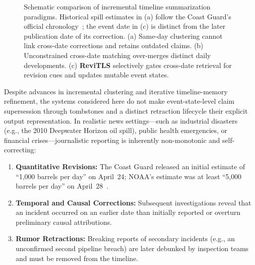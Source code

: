 \documentclass[journal]{IEEEtran}
\begin{document}
\begin{figure}[t]
{%
}
\caption{Schematic comparison of incremental timeline summarization paradigms. Historical spill estimates in (a) follow the Coast Guard's official chronology~\cite{uscg2011onscene}; the event date in (c) is distinct from the later publication date of its correction. (a) Same-day clustering cannot link cross-date corrections and retains outdated claims. (b) Unconstrained cross-date matching over-merges distinct daily developments. (c) \textbf{ReviTLS} selectively gates cross-date retrieval for revision cues and updates mutable event states.}
\label{fig:paradigm}
\end{figure}

Despite advances in incremental clustering and iterative timeline-memory refinement, the systems considered here do not make event-state-level claim supersession through tombstones and a distinct retraction lifecycle their explicit output representation. In realistic news settings---such as industrial disasters (e.g., the 2010 Deepwater Horizon oil spill), public health emergencies, or financial crises---journalistic reporting is inherently non-monotonic and self-correcting:
\begin{enumerate}
    \item \textbf{Quantitative Revisions:} The Coast Guard released an initial estimate of ``1,000 barrels per day'' on April~24; NOAA's estimate was at least ``5,000 barrels per day'' on April~28~\cite{uscg2011onscene}.
    \item \textbf{Temporal and Causal Corrections:} Subsequent investigations reveal that an incident occurred on an earlier date than initially reported or overturn preliminary causal attributions.
    \item \textbf{Rumor Retractions:} Breaking reports of secondary incidents (e.g., an unconfirmed second pipeline breach) are later debunked by inspection teams and must be removed from the timeline.
\end{enumerate}
\end{document}
